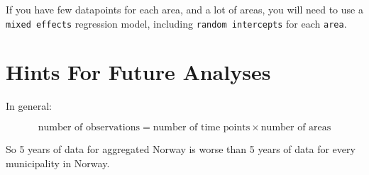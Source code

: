 \documentclass[]{book}
\begin{document}
If you have few datapoints for each area, and a lot of areas, you will
need to use a \texttt{mixed\ effects} regression model, including
\texttt{random\ intercepts} for each \texttt{area}.

\section{Hints For Future Analyses}\label{hints-for-future-analyses-1}

In general:

\[\text{number of observations} = \text{number of time points} \times \text{number of areas}\]

So 5 years of data for aggregated Norway is worse than 5 years of data
for every municipality in Norway.


\end{document}
